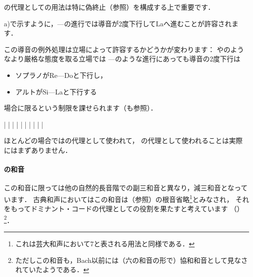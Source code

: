 \documentclass[dvipdfmx,uplatex,b5paper,openany,jbase=12Q,nomag*,textwidth-limit=44%
               ]{gachimuchi}
\begin{document}
の代理としての用法は特に偽終止（参照）を構成する上で重要です．

a)で示すように，---の進行では導音が2度下行してLaへ進むことが許容されます．
\begin{NB}
  この導音の例外処理は立場によって許容するかどうかが変わります：
  やのようなより厳格な態度を取る立場では
  ---のような進行にあっても導音の2度下行は
  \begin{itemize}
    \item ソプラノがRe---Doと下行し，
    \item アルトがSi---Laと下行する
  \end{itemize}
  場合に限るという制限を課せられます（も参照）．
\end{NB}

\begin{floatMusic}[pos=ht]
  \Startpiece%
  \znotes|\en
  \NOTes
  |%
  \en\bar
  \NOTEs
  |%
  \en\doublebar
  \NOTEs
  |%
  \en\bar
  \NOTEs
  |%
  \en\doublebar
  \NOTes
  |%
  \en\bar
  \NOTes
  \Mryaku\sk%
  |%
  \Mryaku\sk
  \en\setdoublebar
  \endpiece%
\end{floatMusic}

ほとんどの場合ではの代理として使われて，
の代理として使われることは実際にはまずありません．

\paragraph{\Gnvii\Dimt の和音}
この和音に限っては他の自然的長音階での副三和音と異なり，減三和音となっています．
古典和声においてはこの和音は\Gnv{}（参照）の根音省略\footnote{%
  これは芸大和声において\Slash\Gnv\subsc7と表される用法と同様である．
}とみなされ，
それをもってドミナント・コードの代理としての役割を果たすと考えています
（）\footnote{%
  ただしこの和音も，Bach以前には（六の和音の形で）協和和音として見なされていたようである\cite[p.64]{chDIETHER1}．
}．
\end{document}

